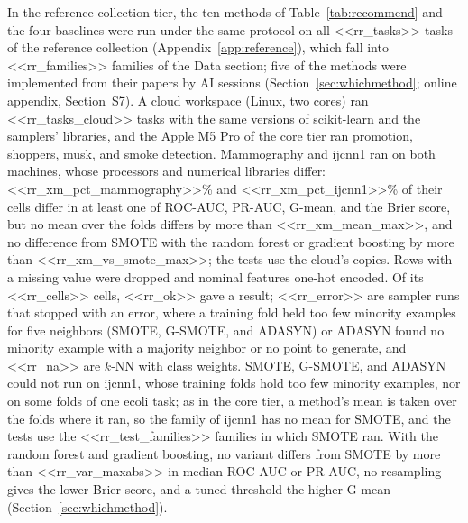 In the reference-collection tier, the ten methods of Table~\ref{tab:recommend} and the four baselines were run under the same protocol on all <<rr_tasks>> tasks of the reference collection (Appendix~\ref{app:reference}), which fall into <<rr_families>> families of the Data section; five of the methods were implemented from their papers by AI sessions (Section~\ref{sec:whichmethod}; online appendix, Section~S7). A cloud workspace (Linux, two cores) ran <<rr_tasks_cloud>> tasks with the same versions of scikit-learn and the samplers' libraries, and the Apple M5 Pro of the core tier ran promotion, shoppers, musk, and smoke detection. Mammography and ijcnn1 ran on both machines, whose processors and numerical libraries differ: <<rr_xm_pct_mammography>>\% and <<rr_xm_pct_ijcnn1>>\% of their cells differ in at least one of ROC-AUC, PR-AUC, G-mean, and the Brier score, but no mean over the folds differs by more than <<rr_xm_mean_max>>, and no difference from SMOTE with the random forest or gradient boosting by more than <<rr_xm_vs_smote_max>>; the tests use the cloud's copies. Rows with a missing value were dropped and nominal features one-hot encoded. Of its <<rr_cells>> cells, <<rr_ok>> gave a result; <<rr_error>> are sampler runs that stopped with an error, where a training fold held too few minority examples for five neighbors (SMOTE, G-SMOTE, and ADASYN) or ADASYN found no minority example with a majority neighbor or no point to generate, and <<rr_na>> are $k$-NN with class weights. SMOTE, G-SMOTE, and ADASYN could not run on ijcnn1, whose training folds hold too few minority examples, nor on some folds of one ecoli task; as in the core tier, a method's mean is taken over the folds where it ran, so the family of ijcnn1 has no mean for SMOTE, and the tests use the <<rr_test_families>> families in which SMOTE ran. With the random forest and gradient boosting, no variant differs from SMOTE by more than <<rr_var_maxabs>> in median ROC-AUC or PR-AUC, no resampling gives the lower Brier score, and a tuned threshold the higher G-mean (Section~\ref{sec:whichmethod}).
